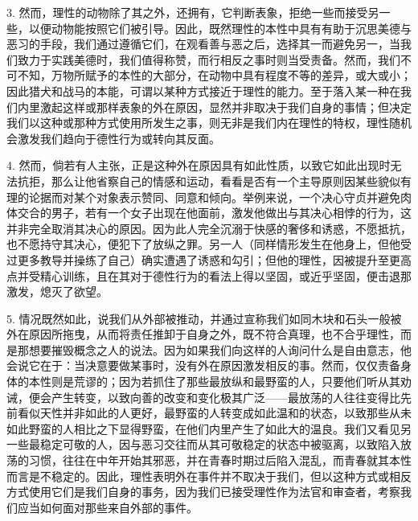3. 然而，理性的动物除了其之外，还拥有，它判断表象，拒绝一些而接受另一些，以便动物能按照它们被引导。因此，既然理性的本性中具有有助于沉思美德与恶习的手段，我们通过遵循它们，在观看善与恶之后，选择其一而避免另一，当我们致力于实践美德时，我们值得称赞，而行相反之事时则当受责备。然而，我们不可不知，万物所赋予的本性的大部分，在动物中具有程度不等的差异，或大或小；因此猎犬和战马的本能，可谓以某种方式接近于理性的能力。至于落入某一种在我们内里激起这样或那样表象的外在原因，显然并非取决于我们自身的事情；但决定我们以这种或那种方式使用所发生之事，则无非是我们内在理性的特权，理性随机会激发我们趋向于德性行为或转向其反面。\par

4. 然而，倘若有人主张，正是这种外在原因具有如此性质，以致它如此出现时无法抗拒，那么让他省察自己的情感和运动，看看是否有一个主导原则因某些貌似有理的论据而对某个对象表示赞同、同意和倾向。举例来说，一个决心守贞并避免肉体交合的男子，若有一个女子出现在他面前，激发他做出与其决心相悖的行为，这并非完全取消其决心的原因。因为此人完全沉溺于快感的奢侈和诱惑，不愿抵抗，也不愿持守其决心，便犯下了放纵之罪。另一人（同样情形发生在他身上，但他受过更多教导并操练了自己）确实遭遇了诱惑和勾引；但他的理性，因被提升至更高点并受精心训练，且在其对于德性行为的看法上得以坚固，或近乎坚固，便击退那激发，熄灭了欲望。\par

5. 情况既然如此，说我们从外部被推动，并通过宣称我们如同木块和石头一般被外在原因所拖曳，从而将责任推卸于自身之外，既不符合真理，也不合乎理性，而是那想要摧毁概念之人的说法。因为如果我们向这样的人询问什么是自由意志，他会说它在于：当决意要做某事时，没有外在原因激发相反的事。然而，仅仅责备身体的本性则是荒谬的；因为若抓住了那些最放纵和最野蛮的人，只要他们听从其劝诫，便会产生转变，以致向善的改变和变化极其广泛——最放荡的人往往变得比先前看似天性并非如此的人更好，最野蛮的人转变成如此温和的状态，以致那些从未如此野蛮的人相比之下显得野蛮，在他们内里产生了如此大的温良。我们又看见另一些最稳定可敬的人，因与恶习交往而从其可敬稳定的状态中被驱离，以致陷入放荡的习惯，往往在中年开始其邪恶，并在青春时期过后陷入混乱，而青春就其本性而言是不稳定的。因此，理性表明外在事件并不取决于我们，但以这种方式或相反方式使用它们是我们自身的事务，因为我们已接受理性作为法官和审查者，考察我们应当如何面对那些来自外部的事件。\par

